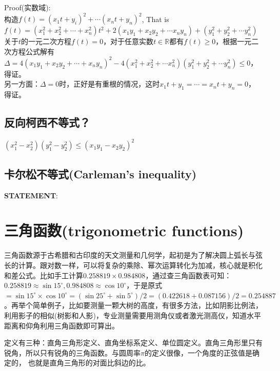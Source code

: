 \documentclass[../main.tex]{subfiles}
\begin{document}
Proof(实数域):\\
构造$f(t)=(x_1t+y_i)^2+\cdots (x_nt+y_n)^2$, That is\\
$f(t)=(x_1^2+x_2^2+\cdots +x_n^2)t^2+2(x_1y_1+x_2y_2+\cdots x_ny_n)+(y_1^2+y_2^2+\cdots y_n^2)$\\
关于$t$的一元二次方程$f(t)=0$，对于任意实数$t \in \mathbb{R}$都有$f(t)\ge 0$，根据一元二次方程公式解有\\
$\Delta= 4(x_1y_1+x_2y_2+\cdots +x_ny_n)^2-4(x_1^2+x_2^2+\cdots x_n^2)(y_1^2+y_2^2+ \cdots y_n^2) \le 0 $，得证。\\
另一方面：$\Delta =0$时，正好是有重根的情况，这时$x_1t+y_1=\cdots =x_nt+y_n=0$，得证。

\subsection{反向柯西不等式？}
$(x_1^2-x_2^2)(y_1^2-y_2^2) \le (x_1y_1-x_2y_2)^2$

\subsection{卡尔松不等式(Carleman's inequality)}
\begin{mdframed}
  \textbf{STATEMENT}:\\
\end{mdframed}

\newpage
\section{三角函数(trigonometric functions)}
三角函数源于古希腊和古印度的天文测量和几何学，起初是为了解决圆上弧长与弦长的计算。跟对数一样，可以将复杂的乘除、幂次运算转化为加减，核心就是积化和差公式。比如手工计算$0.258819\times 0.984808$，通过查三角函数表可知：$0.258819\approx \sin15^{\circ}, 0.984808\approx \cos 10^{\circ}$，于是原式$=\sin15^{\circ}\times\cos10^{\circ}=(\sin25^{\circ}+\sin5^{\circ})/2=(0.422618+0.087156)/2=0.254887$。再举个简单例子，比如要测量一颗大树的高度，有很多方法，比如阴影比例法，利用影子的相似(树影和人影)，专业测量需要用测角仪或者激光测高仪，知道水平距离和仰角利用三角函数即可算出。

定义有三种：直角三角形定义、直角坐标系定义、单位圆定义。直角三角形里只有锐角，所以只有锐角的三角函数。与圆周率$\pi$的定义很像，一个角度的正弦值是确定的， 也就是直角三角形的对面比斜边的比。
\end{document}
